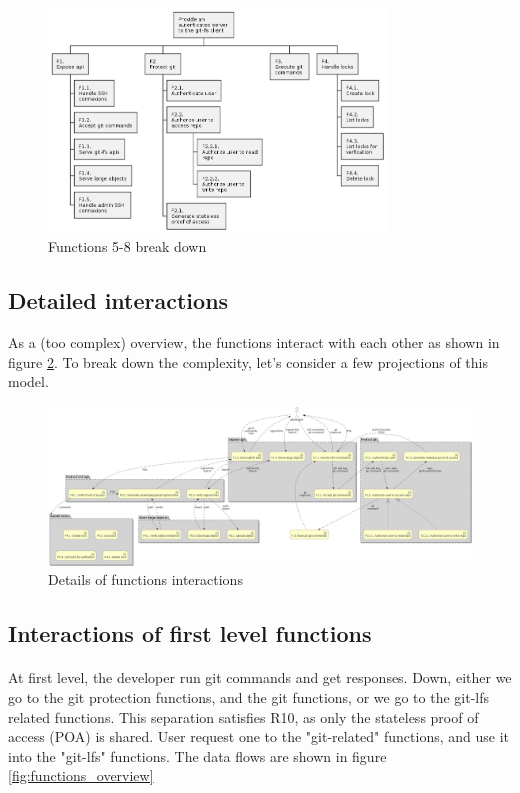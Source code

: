 \begin{figure}[H]
    \centering
    \includegraphics[width=0.8\textwidth]{design/diagrams/functions.png}
    \caption{Functions 5-8 break down}
    \label{fig:functions2}
\end{figure}


\subsection{Detailed interactions}

As a (too complex) overview, the functions interact with each other as shown in figure \ref{fig:functions_detail}. To break down the complexity, let's consider a few projections of this model.

\begin{figure}[h]
    \centering
    \includegraphics[width=\textwidth]{design/diagrams/detailed_flow.png}
    \caption{Details of functions interactions}
    \label{fig:functions_detail}
\end{figure}

\subsection{Interactions of first level functions}


\paragraph{}
At first level, the developer run git commands and get responses. Down, either we go to the git protection functions, and the git functions, or we go to the git-lfs related functions. This separation satisfies R10, as only the stateless proof of access (POA) is shared. User request one to the "git-related" functions, and use it into the "git-lfs" functions. The data flows are shown in figure \ref{fig:functions_overview}

